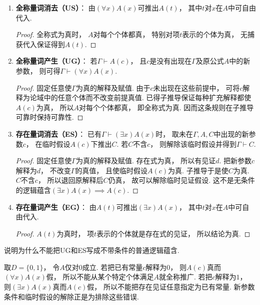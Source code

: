 \begin{enumerate}
    \item \textbf{全称量词消去（US）}：
    由\((\forall x)A(x)\)可推出\(A(t)\)，
    其中\(t\)对\(x\)在\(A\)中可自由代入.
    \begin{proof}
        全称式为真时，
        \(A\)对每个个体都真，
        特别对项\(t\)表示的个体为真，
        无捕获代入保证得到\(A(t)\).
    \end{proof}

    \item \textbf{全称量词产生（UG）}：
    若\(\Gamma\vdash A(c)\)，
    且\(c\)是没有出现在\(\Gamma\)及原公式\(A\)中的新参数，
    则可得\(\Gamma\vdash(\forall x)A(x)\).
    \begin{proof}
        固定任意使\(\Gamma\)为真的解释及赋值.
        由于\(c\)未出现在这些前提中，
        可将\(c\)解释为论域中的任意个体而不改变前提真值.
        已得子推导保证每种扩充解释都使\(A(c)\)为真，
        所以\(A\)对每个个体都真，
        即全称式为真.
        因而这条规则在子推导可靠时保持可靠性.
    \end{proof}

    \item \textbf{存在量词消去（ES）}：
    已有\(\Gamma\vdash(\exists x)A(x)\)时，
    取未在\(\Gamma,A,C\)中出现的新参数\(c\)，
    在临时假设\(A(c)\)下推出\(C\).
    若\(C\)不含\(c\)，
    则解除该临时假设并得到\(\Gamma\vdash C\).
    \begin{proof}
        固定任意使\(\Gamma\)为真的解释及赋值.
        存在式为真，
        所以有见证\(d\).
        把新参数\(c\)解释为\(d\)，
        不改变\(\Gamma\)的真值，
        且使临时假设\(A(c)\)为真.
        子推导于是使\(C\)为真.
        \(C\)不含\(c\)，
        所以退回原解释后\(C\)仍真，
        故可以解除临时见证假设.
        这不是无条件的逻辑蕴含\((\exists x)A(x)\implies A(c)\).
    \end{proof}

    \item \textbf{存在量词产生（EG）}：
    由\(A(t)\)可推出\((\exists x)A(x)\)，
    其中\(t\)对\(x\)在\(A\)中可自由代入.
    \begin{proof}
        \(A(t)\)为真时，
        项\(t\)表示的个体就是存在式的见证，
        所以结论为真.
    \end{proof}
\end{enumerate}

\begin{example}
    说明为什么不能把UG和ES写成不带条件的普通逻辑蕴含.
    \begin{solution}
        取\(D=\{0,1\}\)，
        令\(A\)仅对\(0\)成立.
        若把已有常量\(c\)解释为\(0\)，
        则\(A(c)\)真而\((\forall x)A(x)\)假，
        所以不能从某个特定个体满足\(A\)就全称推广.
        若把\(c\)解释为\(1\)，
        则\((\exists x)A(x)\)真而\(A(c)\)假，
        所以不能把存在见证任意指定为已有常量.
        新参数条件和临时假设的解除正是为排除这些错误.
    \end{solution}
\end{example}

